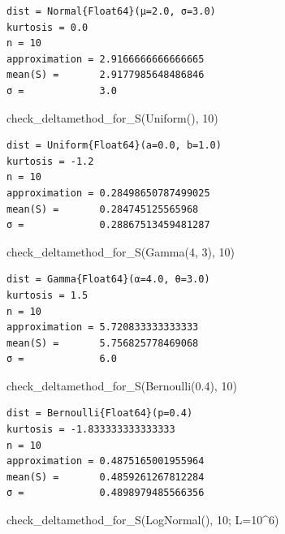 \documentclass[
  letterpaper,
  DIV=11,
  numbers=noendperiod]{scrartcl}
\newenvironment{Shaded}{\begin{snugshade}}{\end{snugshade}}
\newcommand{\FloatTok}[1]{\textcolor[rgb]{0.68,0.00,0.00}{#1}}
\newcommand{\FunctionTok}[1]{\textcolor[rgb]{0.28,0.35,0.67}{#1}}
\newcommand{\NormalTok}[1]{\textcolor[rgb]{0.00,0.23,0.31}{#1}}
\newcommand{\OperatorTok}[1]{\textcolor[rgb]{0.37,0.37,0.37}{#1}}
\begin{document}
\begin{verbatim}
dist = Normal{Float64}(μ=2.0, σ=3.0)
kurtosis = 0.0
n = 10
approximation = 2.9166666666666665
mean(S) =       2.9177985648486846
σ =             3.0
\end{verbatim}

\begin{Shaded}
\begin{Highlighting}[]
\FunctionTok{check\_deltamethod\_for\_S}\NormalTok{(}\FunctionTok{Uniform}\NormalTok{(), }\FloatTok{10}\NormalTok{)}
\end{Highlighting}
\end{Shaded}

\begin{verbatim}
dist = Uniform{Float64}(a=0.0, b=1.0)
kurtosis = -1.2
n = 10
approximation = 0.28498650787499025
mean(S) =       0.284745125565968
σ =             0.28867513459481287
\end{verbatim}

\begin{Shaded}
\begin{Highlighting}[]
\FunctionTok{check\_deltamethod\_for\_S}\NormalTok{(}\FunctionTok{Gamma}\NormalTok{(}\FloatTok{4}\NormalTok{, }\FloatTok{3}\NormalTok{), }\FloatTok{10}\NormalTok{)}
\end{Highlighting}
\end{Shaded}

\begin{verbatim}
dist = Gamma{Float64}(α=4.0, θ=3.0)
kurtosis = 1.5
n = 10
approximation = 5.720833333333333
mean(S) =       5.756825778469068
σ =             6.0
\end{verbatim}

\begin{Shaded}
\begin{Highlighting}[]
\FunctionTok{check\_deltamethod\_for\_S}\NormalTok{(}\FunctionTok{Bernoulli}\NormalTok{(}\FloatTok{0.4}\NormalTok{), }\FloatTok{10}\NormalTok{)}
\end{Highlighting}
\end{Shaded}

\begin{verbatim}
dist = Bernoulli{Float64}(p=0.4)
kurtosis = -1.833333333333333
n = 10
approximation = 0.4875165001955964
mean(S) =       0.4859261267812284
σ =             0.4898979485566356
\end{verbatim}

\begin{Shaded}
\begin{Highlighting}[]
\FunctionTok{check\_deltamethod\_for\_S}\NormalTok{(}\FunctionTok{LogNormal}\NormalTok{(), }\FloatTok{10}\NormalTok{; L}\OperatorTok{=}\FloatTok{10}\OperatorTok{\^{}}\FloatTok{6}\NormalTok{)}
\end{Highlighting}
\end{Shaded}
\end{document}
